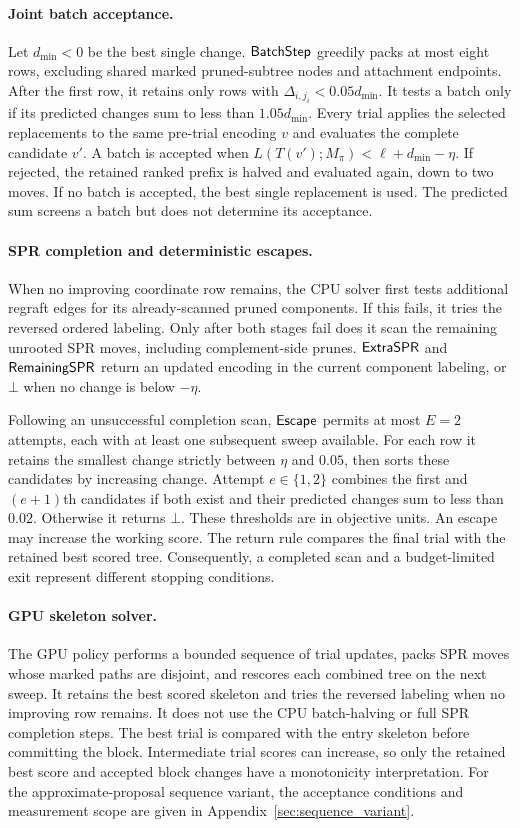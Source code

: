 \paragraph{Joint batch acceptance.}
Let $d_{\min}<0$ be the best single change.
$\mathsf{BatchStep}$ greedily packs at most eight rows, excluding shared marked pruned-subtree nodes and attachment endpoints.
After the first row, it retains only rows with $\Delta_{i,j_i}<0.05d_{\min}$.
It tests a batch only if its predicted changes sum to less than $1.05d_{\min}$.
Every trial applies the selected replacements to the same pre-trial encoding $v$ and evaluates the complete candidate $v'$.
A batch is accepted when
$L(T(v');M_\pi)<\ell+d_{\min}-\eta$.
If rejected, the retained ranked prefix is halved and evaluated again, down to two moves.
If no batch is accepted, the best single replacement is used.
The predicted sum screens a batch but does not determine its acceptance.

\paragraph{SPR completion and deterministic escapes.}
When no improving coordinate row remains, the CPU solver first tests additional regraft edges for its already-scanned pruned components.
If this fails, it tries the reversed ordered labeling.
Only after both stages fail does it scan the remaining unrooted SPR moves, including complement-side prunes.
$\mathsf{ExtraSPR}$ and $\mathsf{RemainingSPR}$ return an updated encoding in the current component labeling, or $\bot$ when no change is below $-\eta$.

Following an unsuccessful completion scan, $\mathsf{Escape}$ permits at most $E=2$ attempts, each with at least one subsequent sweep available.
For each row it retains the smallest change strictly between $\eta$ and $0.05$, then sorts these candidates by increasing change.
Attempt $e\in\{1,2\}$ combines the first and $(e+1)$th candidates if both exist and their predicted changes sum to less than $0.02$.
Otherwise it returns $\bot$.
These thresholds are in objective units.
An escape may increase the working score. The return rule compares the final trial with the retained best scored tree.
Consequently, a completed scan and a budget-limited exit represent different stopping conditions.

\paragraph{GPU skeleton solver.}
The GPU policy performs a bounded sequence of trial updates, packs SPR moves whose marked paths are disjoint, and rescores each combined tree on the next sweep.
It retains the best scored skeleton and tries the reversed labeling when no improving row remains.
It does not use the CPU batch-halving or full SPR completion steps.
The best trial is compared with the entry skeleton before committing the block.
Intermediate trial scores can increase, so only the retained best score and accepted block changes have a monotonicity interpretation.
For the approximate-proposal sequence variant, the acceptance conditions and measurement scope are given in Appendix~\ref{sec:sequence_variant}.

